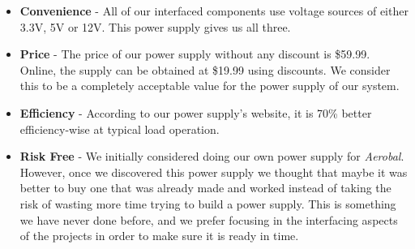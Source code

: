		\begin{itemize}
		  \item \textbf{Convenience} - All of our interfaced components use voltage sources of either 3.3V, 5V or 12V. This power supply gives us all three. 
		  \item \textbf{Price} - The price of our power supply without any discount is \$59.99. Online, the supply can be obtained at \$19.99 using discounts. We consider this to be a completely acceptable value for the power supply of our system. 
		  \item \textbf{Efficiency} - According to our power supply's website, it is 70\% better efficiency-wise at typical load operation.
		  \item \textbf{Risk Free} - We initially considered doing our own power supply for \textit{Aerobal}. However, once we discovered this power supply we thought that maybe it was better to buy one that was already made and worked instead of taking the risk of wasting more time trying to build a power supply. This is something we have never done before, and we prefer focusing in the interfacing aspects of the projects in order to make sure it is ready in time.

		\end{itemize}


\newpage
		 
\leavevmode
